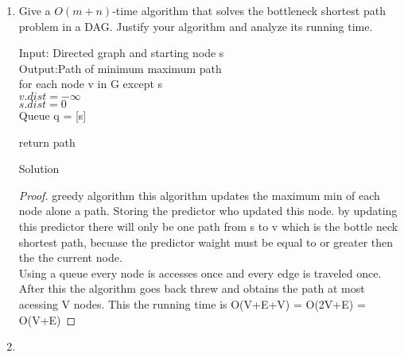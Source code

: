 \documentclass[12pt]{article}
\begin{document}
\begin{enumerate}
         \begin{enumerate}
         \item
         Give a $O(m + n)$-time algorithm that solves the bottleneck shortest path problem in a
DAG. Justify your algorithm and analyze its running time.

\begin{algorithm}[H]
\SetAlgoLined
Input: Directed graph and starting node s\\
Output:Path of minimum maximum path\\
for each node v in G except s\\
 $v.dist = -\infty$\\
   $s.dist = 0 $\\
	Queue q = [s]\\
		
	
 return path\;
 \caption{ Solution}
\end{algorithm}
 \begin{proof}
	greedy algorithm  	
	this algorithm updates the maximum min of each node alone a path. Storing the predictor who updated this node. by updating this predictor there will only be one path from s to v which is the bottle neck shortest path, becuase the predictor waight must be equal to or greater then the the current node. \\
	
 Using a queue every node is accesses once and every edge is traveled once. After this the algorithm goes back threw and obtains the path at most acessing V nodes. This the running time is O(V+E+V) = O(2V+E) = O(V+E)
 	
 \end{proof}
\item


\end{enumerate}
\end{enumerate}
\end{document}
